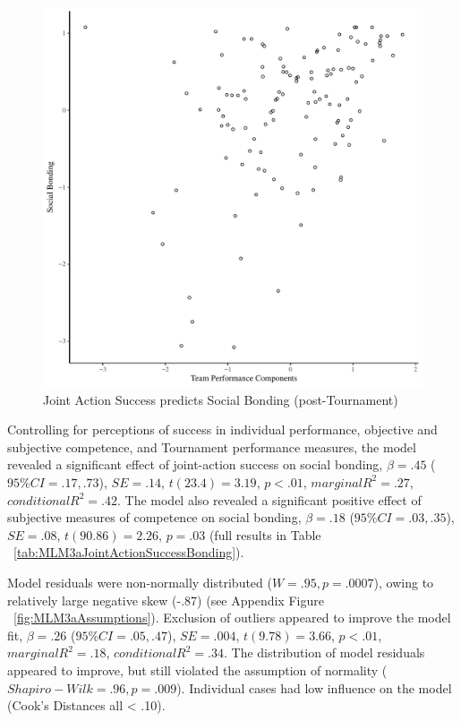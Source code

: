 \begin{figure}[htbp]
  \centering
\includegraphics[scale=.5]{images/jasBondBasicXY.pdf}
  \caption{Joint Action Success predicts Social Bonding (post-Tournament)}
  \label{fig:jasBondBasicXY}
\end{figure}

Controlling for perceptions of success in individual performance, objective and subjective competence, and Tournament performance measures, the model revealed a significant effect of joint-action success on social bonding, $\beta = .45$ ($95\% CI =  .17, .73$), $SE = .14$, $t(23.4) = 3.19$, $p < .01$, $marginal R^2 = .27$, $conditional R^2 = .42$.  The model also revealed a significant positive effect of subjective measures of competence on social bonding, $\beta = .18$ ($95\% CI =  .03, .35$), $SE = .08$, $t(90.86) = 2.26$, $p = .03$ (full results in Table ~\ref{tab:MLM3aJointActionSuccessBonding}).

Model residuals were non-normally distributed ($W = .95, p = .0007$), owing to relatively large negative skew (-.87) (see Appendix Figure ~\ref{fig:MLM3aAssumptions}).
Exclusion of outliers appeared to improve the model fit, $\beta = .26$ ($95\% CI =  .05, .47$), $SE = .004$, $t(9.78) = 3.66$, $p < .01$, $marginal R^2 = .18$, $conditional R^2 = .34$.  The distribution of model residuals appeared to improve, but still violated the assumption of normality ($Shapiro-Wilk = .96, p = .009$).  Individual cases had low influence on the model (Cook's Distances all < .10).

